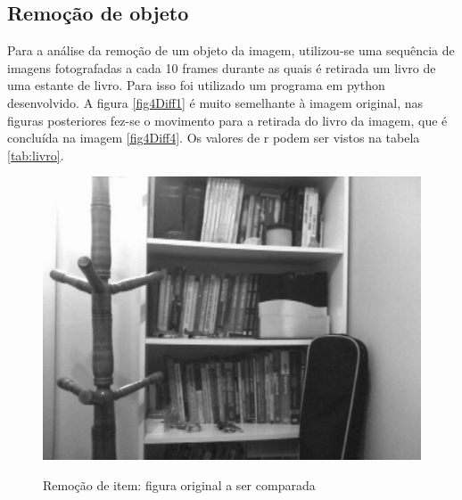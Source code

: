 \documentclass[10pt,a4paper]{article}
\begin{document}
\newpage
\subsection{Remoção de objeto}
Para a análise da remoção de um objeto da imagem, utilizou-se uma
sequência de imagens fotografadas a cada 10 frames durante as quais é retirada
um livro de uma estante de livro. Para isso foi utilizado um programa em  python
desenvolvido.
A figura \ref{fig4Diff1} é muito semelhante à imagem original, nas
figuras posteriores fez-se o movimento para a retirada do livro da
imagem, que é concluída na imagem \ref{fig4Diff4}.
Os valores de r podem ser vistos na tabela \ref{tab:livro}.

\begin{figure}[h!]
  \begin{center}
    \includegraphics[scale=0.25]{photos/livros/gBase} \label{livro}
    \caption{Remoção de item: figura original a ser comparada}
  \end{center}
\end{figure}
\vspace{-0.5cm}
\end{document}
